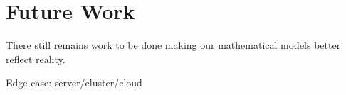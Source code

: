 \section{Future Work}

There still remains work to be done making our mathematical models better
reflect reality.

Edge case: server/cluster/cloud